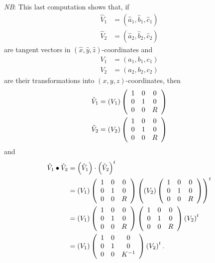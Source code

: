 \documentclass{article}%
\begin{document}
\textit{NB}: This last computation shows that, if
\begin{align*}
\hat{V}_{1}  &  =\left(  \hat{a}_{1},\hat{b}_{1},\hat{c}_{1}\right) \\
\hat{V}_{2}  &  =\left(  \hat{a}_{2},\hat{b}_{2},\hat{c}_{2}\right)
\end{align*}
are tangent vectors in $\left(  \hat{x},\hat{y},\hat{z}\right)  $-coordinates
and%
\begin{align*}
V_{1}  &  =\left(  a_{1},b_{1},c_{1}\right) \\
V_{2}  &  =\left(  a_{2},b_{2},c_{2}\right)
\end{align*}
are their transformations into $\left(  x,y,z\right)  $-coordinates, then%
\begin{align*}
\hat{V}_{1}  &  =\left(  V_{1}\right)  \left(
\begin{array}
[c]{ccc}%
1 & 0 & 0\\
0 & 1 & 0\\
0 & 0 & R
\end{array}
\right) \\
\hat{V}_{2}  &  =\left(  V_{2}\right)  \left(
\begin{array}
[c]{ccc}%
1 & 0 & 0\\
0 & 1 & 0\\
0 & 0 & R
\end{array}
\right)
\end{align*}
and%
\begin{align*}
\hat{V}_{1}\bullet\hat{V}_{2}  &  =\left(  \hat{V}_{1}\right)  \cdot\left(
\hat{V}_{2}\right)  ^{t}\\
&  =\left(  V_{1}\right)  \left(
\begin{array}
[c]{ccc}%
1 & 0 & 0\\
0 & 1 & 0\\
0 & 0 & R
\end{array}
\right)  \left(  \left(  V_{2}\right)  \left(
\begin{array}
[c]{ccc}%
1 & 0 & 0\\
0 & 1 & 0\\
0 & 0 & R
\end{array}
\right)  \right)  ^{t}\\
&  =\left(  V_{1}\right)  \left(
\begin{array}
[c]{ccc}%
1 & 0 & 0\\
0 & 1 & 0\\
0 & 0 & R
\end{array}
\right)  \left(
\begin{array}
[c]{ccc}%
1 & 0 & 0\\
0 & 1 & 0\\
0 & 0 & R
\end{array}
\right)  \left(  V_{2}\right)  ^{t}\\
&  =\left(  V_{1}\right)  \left(
\begin{array}
[c]{ccc}%
1 & 0 & 0\\
0 & 1 & 0\\
0 & 0 & K^{-1}%
\end{array}
\right)  \left(  V_{2}\right)  ^{t}.
\end{align*}
\end{document}
